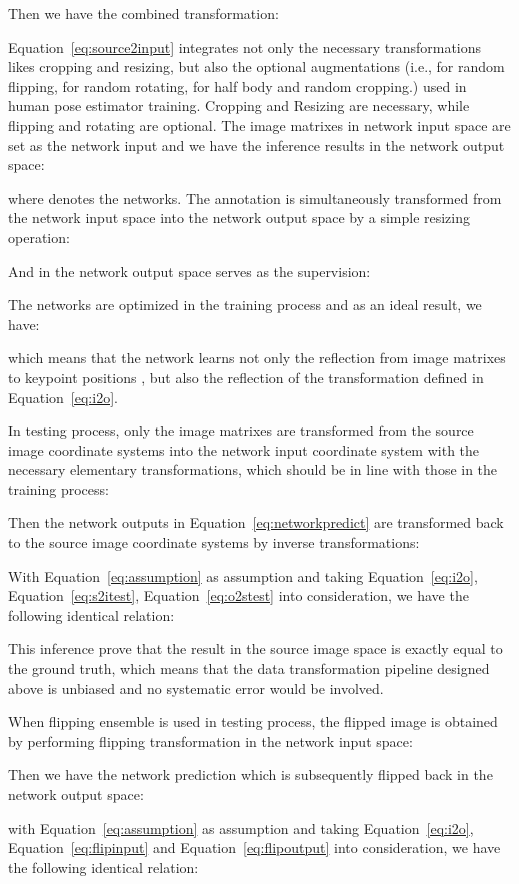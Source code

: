 \documentclass[10pt,journal,compsoc]{IEEEtran}
\begin{document}
Then we have the combined transformation:

Equation~\ref{eq:source2input} integrates not only the necessary transformations likes cropping and resizing, but also the optional augmentations (i.e.,  for random flipping,  for random rotating,  for half body and random cropping.) used in human pose estimator training. Cropping and Resizing are necessary, while flipping and rotating are optional. The image matrixes in network input space are set as the network input and we have the inference results in the network output space:

where  denotes the networks. The annotation is simultaneously transformed from the network input space into the network output space by a simple resizing operation:

And  in the network output space serves as the supervision:

The networks are optimized in the training process and as an ideal result, we have:

which means that the network learns not only the reflection from image matrixes  to keypoint positions , but also the reflection of the transformation  defined in Equation~\ref{eq:i2o}.

In testing process, only the image matrixes are transformed from the source image coordinate systems into the network input coordinate system with the necessary elementary transformations, which should be in line with those in the training process:

Then the network outputs in Equation~\ref{eq:networkpredict} are transformed back to the source image coordinate systems by inverse transformations:

With Equation~\ref{eq:assumption} as assumption and taking Equation~\ref{eq:i2o}, Equation~\ref{eq:s2itest}, Equation~\ref{eq:o2stest} into consideration, we have the following identical relation:

This inference prove that the result in the source image space is exactly equal to the ground truth, which means that the data transformation pipeline designed above is unbiased and no systematic error would be involved.

When flipping ensemble is used in testing process, the flipped image is obtained by performing flipping transformation in the network input space:

Then we have the network prediction  which is subsequently flipped back in the network output space:

with Equation~\ref{eq:assumption} as assumption and taking Equation~\ref{eq:i2o}, Equation~\ref{eq:flipinput} and Equation~\ref{eq:flipoutput} into consideration, we have the following identical relation:
\end{document}
